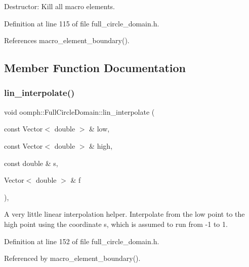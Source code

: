 Destructor\+: Kill all macro elements. 



Definition at line 115 of file full\+\_\+circle\+\_\+domain.\+h.



References macro\+\_\+element\+\_\+boundary().



\subsection{Member Function Documentation}
\mbox{\label{classoomph_1_1FullCircleDomain_a77b7b1454eb0082545b1b63310cb978a}} 
\subsubsection{\texorpdfstring{lin\+\_\+interpolate()}{lin\_interpolate()}}
{\footnotesize\ttfamily void oomph\+::\+Full\+Circle\+Domain\+::lin\+\_\+interpolate (\begin{DoxyParamCaption}\item[{const Vector$<$ double $>$ \&}]{low,  }\item[{const Vector$<$ double $>$ \&}]{high,  }\item[{const double \&}]{s,  }\item[{Vector$<$ double $>$ \&}]{f }\end{DoxyParamCaption})\hspace{0.3cm}{\ttfamily [inline]}, {\ttfamily [private]}}



A very little linear interpolation helper. Interpolate from the low point to the high point using the coordinate s, which is assumed to run from -\/1 to 1. 



Definition at line 152 of file full\+\_\+circle\+\_\+domain.\+h.



Referenced by macro\+\_\+element\+\_\+boundary().

\mbox{\label{classoomph_1_1FullCircleDomain_a93253d6c878c3ab40a582e0d2070a69d}} 
